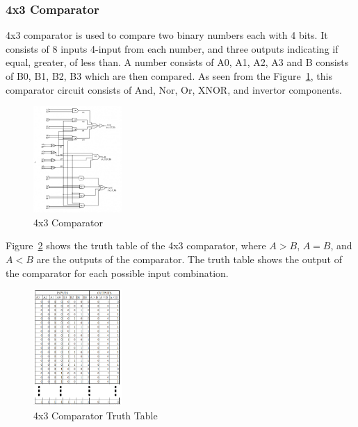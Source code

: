 \documentclass[conference]{IEEEtran}
\begin{document}
\subsubsection{4x3 Comparator}
4x3 comparator is used to compare two binary numbers each with 4 bits. It consists of 8 inputs 4-input from each number, and three outputs indicating if equal, greater, of less than. A number consists of A0, A1, A2, A3 and B consists of B0, B1, B2, B3 which are then compared. As seen from the Figure~\ref{fig:4x3Comparator}, this comparator circuit consists of And, Nor, Or, XNOR, and invertor components.
\begin{figure}[h]
    \centering
    \includegraphics[width=0.3\textwidth]{assets/4x3ComparatorCircuit.jpg}
    \caption{4x3 Comparator}
    \label{fig:4x3Comparator}
\end{figure}

Figure~\ref{fig:4x3ComparatorTruthTable} shows the truth table of the 4x3 comparator, where $A>B$, $A=B$, and $A<B$ are the outputs of the comparator. The truth table shows the output of the comparator for each possible input combination.
\begin{figure}[h]
    \centering
    \includegraphics[width=0.3\textwidth]{assets/4x3ComparatorTruthTable.png}
    \caption{4x3 Comparator Truth Table}
    \label{fig:4x3ComparatorTruthTable}
\end{figure}
\end{document}
